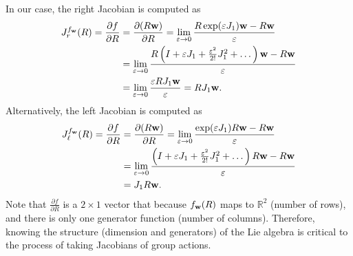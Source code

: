 In our case, the right Jacobian is computed as
\begin{align*}
J_r^{f_{\mathbf{w}}}(R) = \frac{\partial f}{\partial R} &= \frac{\partial (R\mathbf{w})}{\partial R} 
  = \lim_{\varepsilon\to 0} \frac{R\exp(\varepsilon J_1)\mathbf{w} - R\mathbf{w}}{\varepsilon} \\
  &= \lim_{\varepsilon\to 0} \frac{R\left(I + \varepsilon J_1 + \frac{\varepsilon^2}{2!}J_1^2 + \dots \right)\mathbf{w} - R\mathbf{w}}{\varepsilon} \\
  &= \lim_{\varepsilon\to 0} \frac{\varepsilon RJ_1\mathbf{w}}{\varepsilon} 
  = R J_1 \mathbf{w}.
\end{align*}
Alternatively, the left Jacobian is computed as
\begin{align*}
J_\ell^{f_{\mathbf{w}}}(R) = \frac{\partial f}{\partial R} &= \frac{\partial (R\mathbf{w})}{\partial R} 
  = \lim_{\varepsilon\to 0} \frac{\exp(\varepsilon J_1)R\mathbf{w} - R\mathbf{w}}{\varepsilon} \\
  &= \lim_{\varepsilon\to 0} \frac{\left(I + \varepsilon J_1 + \frac{\varepsilon^2}{2!}J_1^2 + \dots \right)R\mathbf{w} - R\mathbf{w}}{\varepsilon} \\
  &= J_1 R \mathbf{w}.
\end{align*}
Note that $\frac{\partial f}{\partial R}$ is a $2\times 1$ vector that because $f_{\mathbf{w}}(R)$ maps to $\mathbb{R}^2$ (number of rows), and there is only one generator function (number of columns).
Therefore, knowing the structure (dimension and generators) of the Lie algebra is critical to the process of taking Jacobians of group actions.

